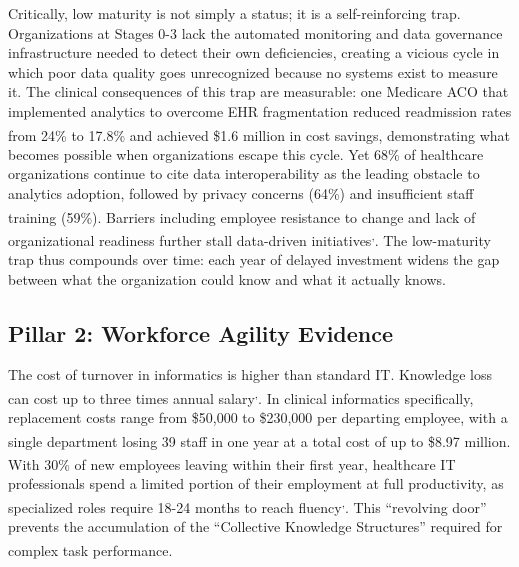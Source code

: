 \documentclass[
  american,
  11pt,
  letterpaper,
  oneside  ,captions=tableheading
]{scrartcl}
\begin{document}
Critically, low maturity is not simply a status; it is a
self-reinforcing trap. Organizations at Stages 0-3 lack the automated
monitoring and data governance infrastructure needed to detect their own
deficiencies, creating a vicious cycle in which poor data quality goes
unrecognized because no systems exist to measure it. The clinical
consequences of this trap are measurable: one Medicare ACO that
implemented analytics to overcome EHR fragmentation reduced readmission
rates from 24\% to 17.8\% and achieved \$1.6 million in cost
savings\textsuperscript{}, demonstrating
what becomes possible when organizations escape this cycle. Yet 68\% of
healthcare organizations continue to cite data interoperability as the
leading obstacle to analytics adoption, followed by privacy concerns
(64\%) and insufficient staff training
(59\%)\textsuperscript{}. Barriers
including employee resistance to change and lack of organizational
readiness further stall data-driven
initiatives\textsuperscript{,}.
The low-maturity trap thus compounds over time: each year of delayed
investment widens the gap between what the organization could know and
what it actually knows.

\subsection{Pillar 2: Workforce Agility
Evidence}\label{pillar-2-workforce-agility-evidence}

The cost of turnover in informatics is higher than standard IT.
Knowledge loss can cost up to three times annual
salary\textsuperscript{,}.
In clinical informatics specifically, replacement costs range from
\$50,000 to \$230,000 per departing employee, with a single department
losing 39 staff in one year at a total cost of up to \$8.97
million\textsuperscript{}. With 30\% of
new employees leaving within their first
year\textsuperscript{}, healthcare IT
professionals spend a limited portion of their employment at full
productivity, as specialized roles require 18-24 months to reach
fluency\textsuperscript{,}.
This ``revolving door'' prevents the accumulation of the ``Collective
Knowledge Structures'' required for complex task
performance\textsuperscript{}.
\end{document}
